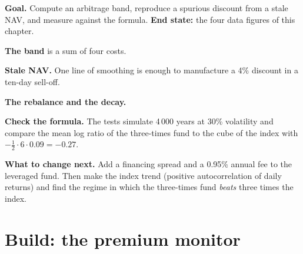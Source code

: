 \begin{tutorial}
\textbf{Goal.} Compute an arbitrage band, reproduce a spurious discount from
a stale NAV, and measure  against the formula. \textbf{End
state:} the four data figures of this chapter.
\begin{tutsteps}
\item \textbf{The band} is a sum of four costs.
\label{lst:m1:exchange-traded-funds:band}
\item \textbf{Stale NAV.} One line of smoothing is enough to manufacture a
4\% discount in a ten-day sell-off.
\label{lst:m1:exchange-traded-funds:stale}
\item \textbf{The rebalance and the decay.}
\label{lst:m1:exchange-traded-funds:lev}
\item \textbf{Check the formula.} The tests simulate 4\,000 years at 30\%
volatility and compare the mean log ratio of the three-times fund to the
cube of the index with $-\tfrac12\cdot6\cdot0.09 = -0.27$.
\end{tutsteps}
\textbf{What to change next.} Add a financing spread and a 0.95\% annual fee
to the leveraged fund. Then make the index trend (positive autocorrelation of
daily returns) and find the regime in which the three-times fund
\emph{beats} three times the index.
\end{tutorial}

\section{Build: the premium monitor}\label{bld:m1:exchange-traded-funds:monitor}

